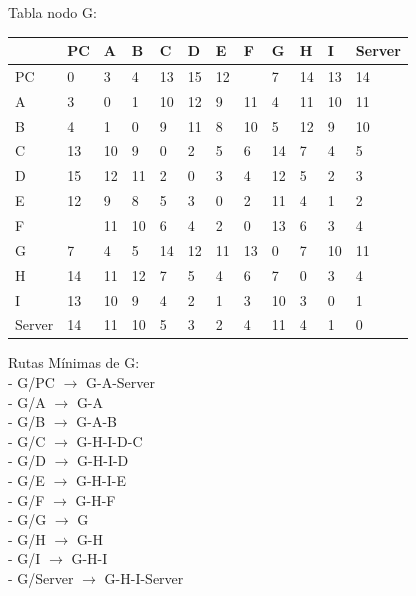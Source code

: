 \documentclass[a4paper]{article}
\begin{document}
\begin{table}[ht]
Tabla nodo G:\\
\begin{tabular}{|l|l|l|l|l|l|l|l|l|l|l|l|}
\hline
       & PC & A  & B & C & D & E & F & G & H & I  & Server \\ \hline
PC     & 0  & 3  & 4 & 13& 15& 12&   & 7 & 14& 13 & 14     \\ \hline
A      & 3  & 0  & 1 & 10& 12& 9 & 11& 4 & 11& 10 & 11     \\ \hline
B      & 4  & 1  & 0 & 9 & 11& 8 & 10& 5 & 12& 9  & 10     \\ \hline
C      & 13 & 10 & 9 & 0 & 2 & 5 & 6 & 14& 7 & 4  & 5      \\ \hline
D      & 15 & 12 & 11& 2 & 0 & 3 & 4 & 12& 5 & 2  & 3      \\ \hline
E      & 12 & 9  & 8 & 5 & 3 & 0 & 2 & 11& 4 & 1  & 2      \\ \hline
F      &    & 11 & 10& 6 & 4 & 2 & 0 & 13& 6 & 3  & 4      \\ \hline
G      & 7  & 4  & 5 & 14& 12& 11& 13& 0 & 7 & 10 & 11     \\ \hline
H      & 14 & 11 & 12& 7 & 5 & 4 & 6 & 7 & 0 & 3  & 4      \\ \hline
I      & 13 & 10 & 9 & 4 & 2 & 1 & 3 & 10& 3 & 0  & 1      \\ \hline
Server & 14 & 11 & 10& 5 & 3 & 2 & 4 & 11& 4 & 1  & 0      \\ \hline
\end{tabular}

Rutas Mínimas de G:\\
-	G/PC  $\rightarrow$  G-A-Server\\
-	G/A  $\rightarrow$  G-A\\
-	G/B  $\rightarrow$  G-A-B\\
-	G/C  $\rightarrow$  G-H-I-D-C\\
-	G/D  $\rightarrow$ G-H-I-D\\
-	G/E  $\rightarrow$  G-H-I-E\\
-	G/F  $\rightarrow$  G-H-F\\
-	G/G  $\rightarrow$  G\\
-	G/H  $\rightarrow$  G-H\\
-	G/I  $\rightarrow$  G-H-I\\
-	G/Server  $\rightarrow$  G-H-I-Server\\

\end{table}

\clearpage
\end{document}
